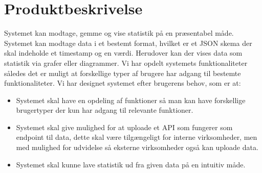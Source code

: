 \section{Produktbeskrivelse}
Systemet kan modtage, gemme og vise statistik på en præsentabel måde. Systemet kan modtage data i et bestemt format, hvilket er et JSON skema der 
skal indeholde et timestamp og en værdi. Herudover kan der vises data som statistik via grafer eller diagrammer.
Vi har opdelt systemets funktionaliteter således det er muligt at forskellige typer af brugere har adgang til bestemte funktionaliteter.
Vi har designet systemet efter brugerens behov, som er at: 
\begin{itemize}
    \item Systemet skal have en opdeling af funktioner så man kan have forskellige brugertyper der kun har adgang til relevante funktioner.
    \item Systemet skal give mulighed for at uploade et API som fungerer som endpoint til data, dette skal være tilgængeligt for interne virksomheder, men med mulighed for udvidelse så eksterne virksomheder også kan uploade data.
    \item Systemet skal kunne lave statistik ud fra given data på en intuitiv måde.
\end{itemize}
